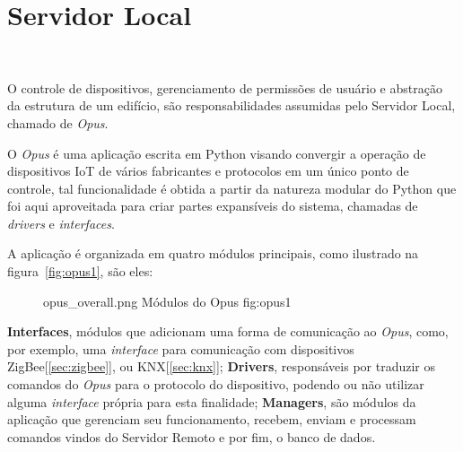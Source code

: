 \section{\textbf{Servidor Local}}
~\label{opus}

O controle de dispositivos, gerenciamento de permissões de usuário e abstração da estrutura de um edifício,
são responsabilidades assumidas pelo Servidor Local, chamado de \emph{Opus}.

O \emph{Opus} é uma aplicação escrita em Python visando convergir a operação de dispositivos IoT de vários
fabricantes e protocolos em um único ponto de controle, tal funcionalidade é obtida a partir da natureza modular
do Python que foi aqui aproveitada para criar partes expansíveis do sistema, chamadas de \emph{drivers} e \emph{interfaces}.

A aplicação é organizada em quatro módulos principais, como ilustrado na figura~\ref{fig:opus1}, são eles:
\begin{figure}[h!]
    {opus_overall.png}
    {Módulos do Opus}
    {fig:opus1}
\end{figure}

\textbf{Interfaces}, módulos que adicionam uma forma de comunicação ao \emph{Opus}, como, por exemplo, 
uma \emph{interface} para comunicação com dispositivos ZigBee[\ref{sec:zigbee}], ou KNX[\ref{sec:knx}]; 
\textbf{Drivers}, responsáveis por traduzir os comandos do \emph{Opus} para o protocolo do dispositivo, 
podendo ou não utilizar alguma \emph{interface} própria para esta finalidade; \textbf{Managers}, são módulos da aplicação 
que gerenciam seu funcionamento, recebem, enviam e processam comandos vindos do Servidor Remoto e por fim, o banco de dados.













